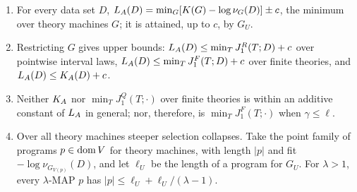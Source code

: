\begin{proposition}\label{prop:laws:twopart}
\leavevmode
\begin{enumerate}[label=(\alph*),itemsep=1pt,topsep=2pt]
\item For every data set $D$, $L_{A}(D)=\min_G[K(G)-\log\nu_G(D)]\pm c$, the minimum over theory machines $G$; it is attained, up to $c$, by $G_U$.
\item Restricting $G$ gives upper bounds: $L_{A}(D)\le\min_TJ^R_1(T;D)+c$ over pointwise interval laws, $L_{A}(D)\le\min_TJ^F_1(T;D)+c$ over finite theories, and $L_{A}(D)\le K_{A}(D)+c$.
\item Neither $K_{A}$ nor $\min_TJ^Q_1(T;\cdot)$ over finite theories is within an additive constant of $L_{A}$ in general; nor, therefore, is $\min_TJ^F_1(T;\cdot)$ when $\gamma\le\ell$.
\item Over all theory machines steeper selection collapses. Take the point family of programs $p\in\operatorname{dom} V$ for theory machines, with length $\lvert p\rvert$ and fit $-\log\nu_{G_{V(p)}}(D)$, and let $\ell_U$ be the length of a program for $G_U$. For $\lambda>1$, every $\lambda$-MAP $p$ has $\lvert p\rvert\le\ell_U+\ell_U/(\lambda-1)$.
\end{enumerate}
\end{proposition}

